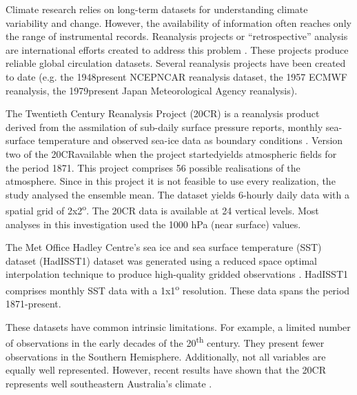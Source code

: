 Climate research relies on long-term datasets for understanding climate
variability and change. However, the availability of information often
reaches only the range of instrumental records. Reanalysis projects
or \textquotedblleft retrospective\textquotedblright{} analysis are
international efforts created to address this problem \citep{Compo2011}.
These projects produce reliable global circulation datasets. Several
reanalysis projects have been created to date (e.g. the 1948\textendash present
NCEP\textendash NCAR reanalysis dataset, the 1957
ECMWF reanalysis, the 1979\textendash present Japan Meteorological
Agency reanalysis). 

The Twentieth Century Reanalysis Project (20CR) is a reanalysis product
derived from the assmilation of sub-daily surface pressure reports,
monthly sea-surface temperature and observed sea-ice data as boundary
conditions \citep{Compo2011}. Version two of the 20CR\textemdash available
when the project started\textemdash yields atmospheric fields for
the period 1871. This project comprises 56 possible
realisations of the atmosphere. Since in this project it is not feasible
to use every realization, the study analysed the ensemble mean. The
dataset yields 6-hourly daily data with a spatial grid of 2x2\textsuperscript{o}.
The 20CR data is available at 24 vertical levels. Most analyses in
this investigation used the 1000 hPa (near surface) values.

The Met Office Hadley Centre\textquoteright s sea ice and sea surface
temperature (SST) dataset (HadISST1) dataset was generated using a
reduced space optimal interpolation technique to produce high-quality
gridded observations \citep{Rayner2003}. HadISST1 comprises monthly
SST data with a 1x1\textsuperscript{o} resolution. These data spans
the period 1871-present.

These datasets have common intrinsic limitations. For example, a limited
number of observations in the early decades of the 20\textsuperscript{th}
century. They present fewer observations in the Southern Hemisphere.
Additionally, not all variables are equally well represented. However,
recent results have shown that the 20CR represents well southeastern
Australia\textquoteright s climate \citep{Ashcroft2014}. 

